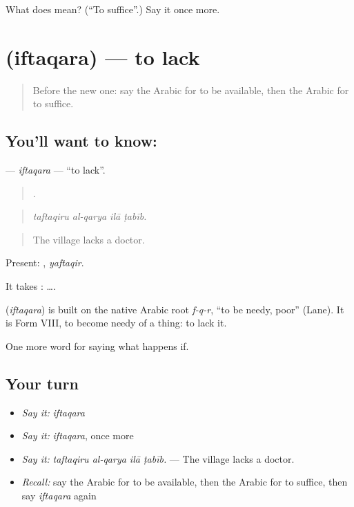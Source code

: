 \begin{tcolorbox}[breakable,colback=teal!4,colframe=teal!35!black,title={Before you move on}]
What does  mean? (\textquotedblleft{}To suffice\textquotedblright{}.) Say it once more.
\end{tcolorbox}
\section[\texorpdfstring{\ar{افتقر} (iftaqara)}{افتقر (iftaqara)}]{ (iftaqara) — to lack}

\label{lesson:AR-C406-iftaqara}



\begin{quote}
Before the new one: say the Arabic for to be available, then the Arabic for to suffice.
\end{quote}

\subsection*{You'll want to know: }
\textbf{} — \emph{iftaqara} — \textquotedblleft{}to lack\textquotedblright{}.

\begin{quote}
   .
\end{quote}

\begin{quote}
\emph{taftaqiru al-qarya ilā ṭabīb.}
\end{quote}

\begin{quote}
The village lacks a doctor.
\end{quote}

Present: , \emph{yaftaqir}.

It takes :   ….

\begin{cousinweb}
\textbf{} (\emph{iftaqara}) is built on the native Arabic root \emph{f-q-r}, \textquotedblleft{}to be needy, poor\textquotedblright{} (Lane). It is Form VIII, to become needy of a thing: to lack it.
\end{cousinweb}

\begin{grammarlens}[title={What you've built}]
One more word for saying what happens if.
\end{grammarlens}

\subsection*{Your turn}
\begin{itemize}
\raggedright
  \item \emph{Say it:} \emph{iftaqara}
  \item \emph{Say it:} \emph{iftaqara}, once more
  \item \emph{Say it:} \emph{taftaqiru al-qarya ilā ṭabīb.} — The village lacks a doctor.
  \item \emph{Recall:} say the Arabic for to be available, then the Arabic for to suffice, then say \emph{iftaqara} again
\end{itemize}

